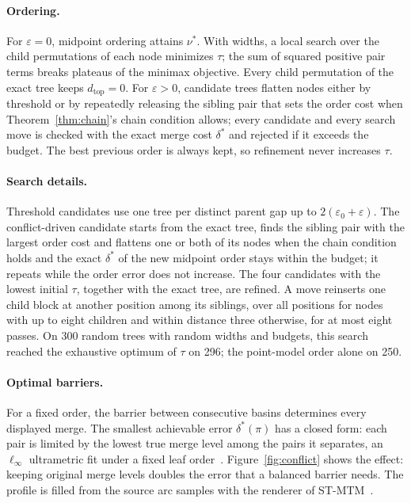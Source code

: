 \documentclass[review]{vgtc}                 %
\newcommand{\dtop}{d_{\mathrm{top}}}
\begin{document}
\paragraph{Ordering.} For $\varepsilon=0$, midpoint ordering attains $\nu^*$. With widths, a local search over the child permutations of each node minimizes $\tau$; the sum of squared positive pair terms breaks plateaus of the minimax objective. Every child permutation of the exact tree keeps $\dtop=0$. For $\varepsilon>0$, candidate trees flatten nodes either by threshold or by repeatedly releasing the sibling pair that sets the order cost when Theorem~\ref{thm:chain}'s chain condition allows; every candidate and every search move is checked with the exact merge cost $\delta^*$ and rejected if it exceeds the budget. The best previous order is always kept, so refinement never increases $\tau$.

\paragraph{Search details.} Threshold candidates use one tree per distinct parent gap up to $2(\varepsilon_0+\varepsilon)$. The conflict-driven candidate starts from the exact tree, finds the sibling pair with the largest order cost and flattens one or both of its nodes when the chain condition holds and the exact $\delta^*$ of the new midpoint order stays within the budget; it repeats while the order error does not increase. The four candidates with the lowest initial $\tau$, together with the exact tree, are refined. A move reinserts one child block at another position among its siblings, over all positions for nodes with up to eight children and within distance three otherwise, for at most eight passes. On 300 random trees with random widths and budgets, this search reached the exhaustive optimum of $\tau$ on 296; the point-model order alone on 250.

\paragraph{Optimal barriers.} For a fixed order, the barrier between consecutive basins determines every displayed merge. The smallest achievable error $\delta^*(\pi)$ has a closed form: each pair is limited by the lowest true merge level among the pairs it separates, an $\ell_\infty$ ultrametric fit under a fixed leaf order~\cite{Farach:1995:RM}. Figure~\ref{fig:conflict} shows the effect: keeping original merge levels doubles the error that a balanced barrier needs. The profile is filled from the source arc samples with the renderer of ST-MTM~\cite{STMTM:2026}.
\end{document}
